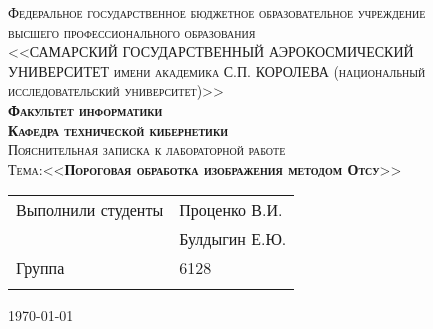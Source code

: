 \begin{titlepage}
\thispagestyle{empty}
\begin{center}\textsc{
Федеральное государственное бюджетное образовательное учреждение\\
высшего профессионального образования\\
<<САМАРСКИЙ ГОСУДАРСТВЕННЫЙ АЭРОКОСМИЧЕСКИЙ\\
УНИВЕРСИТЕТ имени академика С.П. КОРОЛЕВА
(национальный исследовательский университет)>>\\[50pt]
\textbf{Факультет информатики} \\[20pt]
\textbf{Кафедра технической кибернетики}}\\[30pt]
\textsc{
Пояснительная записка к лабораторной работе\\[30pt]
\large{Тема:<<\textbf{Пороговая обработка изображения методом Отсу}>>}\\[110pt]
}
\end{center}
\vfill
{\large
\begin{tabular*}{\textwidth}{@{\extracolsep{\fill}}ll}
	Выполнили студенты& Проценко В.И.\\
						    & Булдыгин Е.Ю.\\[10pt]
	Группа & 6128 \\[10pt]\\
\end{tabular*}
}
\vfill
\begin{center}
\large \today
\end{center}
\clearpage
\end{titlepage}